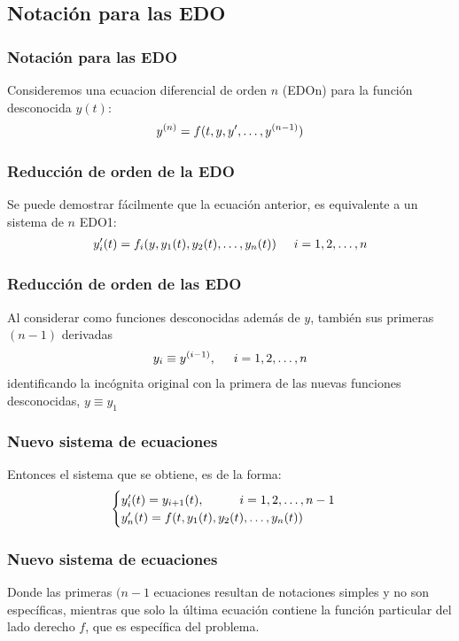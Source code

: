 \subsection{Notación para las EDO}
\begin{frame}
\frametitle{Notación para las EDO}
Consideremos una ecuacion diferencial de orden $n$ (EDOn) para la función desconocida $y(t)$:
\begin{align}
{y}^{(n)} = f(t, y, {y}^{\prime}, \ldots, {y}^{(n-1)})
\label{eq:ecuacion_12_04}
\end{align}
\end{frame}
\begin{frame}
\frametitle{Reducción de orden de la EDO}
Se puede demostrar fácilmente que la ecuación anterior, es equivalente a un sistema de $n$ EDO1:
\begin{align}
{y}^{\prime}_{i} (t) = f_{i} (y, y_{1} (t), y_{2} (t), \ldots, y_{n} (t) ) \hspace{0.5cm} i = 1, 2, \ldots, n
\label{eq:ecuacion_12_05}
\end{align}
\end{frame}
\begin{frame}
\frametitle{Reducción de orden de las EDO}
Al considerar como funciones desconocidas además de $y$, también sus primeras $(n-1)$ derivadas
\begin{align*}
y_{i} \equiv {y}^{(i-1)}, \hspace{0.5cm} i = 1, 2, \ldots, n
\end{align*}
identificando la incógnita original con la primera de las nuevas funciones desconocidas, $y \equiv y_{1}$
\end{frame}
\begin{frame}
\frametitle{Nuevo sistema de ecuaciones}
Entonces el sistema que se obtiene, es de la forma:
\begin{align*}
\begin{cases}
{y}^{\prime}_{i} (t) = y_{i+1} (t), \hspace{1cm} i = 1, 2, \ldots, n-1 \\
{y}^{\prime}_{n} (t) = f(t, y_{1} (t), y_{2} (t), \ldots, y_{n} (t))
\end{cases}
\end{align*}
\end{frame}
\begin{frame}
\frametitle{Nuevo sistema de ecuaciones}
Donde las primeras $(n - 1$ ecuaciones resultan de notaciones simples y no son específicas, mientras que solo la última ecuación contiene la función particular del lado derecho $f$, que es específica del problema.
\end{frame}
